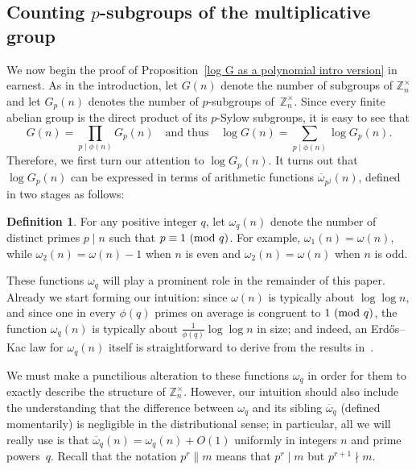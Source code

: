 \documentclass[12pt,reqno]{amsart}
\theoremstyle{definition}
\newtheorem{definition}[theorem]{Definition}
\renewcommand{\mod}[1]{{\ifmmode\text{\rm\ (mod~$#1$)}\else\discretionary{}{}{\hbox{ }}\rm(mod~$#1$)\fi}}
\newcommand{\ovomega}{{\overline\omega}}
\newcommand{\Z}{{\mathbb Z}}
\newcommand{\Znt}{{\Z_n^\times}}
\begin{document}
\subsection{Counting $p$-subgroups of the multiplicative group}

We now begin the proof of Proposition~\ref{log G as a polynomial intro version} in earnest. As in the introduction,
let $G(n)$ denote the number of subgroups of $\Znt$ and let $G_p(n)$ denotes the number of $p$-subgroups of~$\Znt$. Since every finite abelian group is the direct product of its $p$-Sylow subgroups, it is easy to see that
\[
G(n) = \prod_{p \mid \phi(n)} G_p(n) \quad\text{and thus}\quad \log G(n) = \sum_{p \mid \phi(n)} \log G_p(n).
\]
Therefore, we first turn our attention to $\log G_p(n)$. It turns out that $\log G_p(n)$ can be expressed in terms of arithmetic functions $\ovomega_{p^j}(n)$, defined in two stages as follows:

\begin{definition} \label{omega q def}
For any positive integer $q$, let $\omega_q(n)$ denote the number of distinct primes $p \mid n$ such that $p \equiv 1 \mod q$. For example, $\omega_1(n)=\omega(n)$, while $\omega_2(n) = \omega(n)-1$ when $n$ is even and $\omega_2(n) = \omega(n)$ when $n$ is odd.
\end{definition}

These functions $\omega_q$ will play a prominent role in the remainder of this paper.
Already we start forming our intuition: since $\omega(n)$ is typically about $\log\log n$, and since one in every $\phi(q)$ primes on average is congruent to $1\mod q$, the function $\omega_q(n)$ is typically about $\frac1{\phi(q)} \log\log n$ in size; and indeed, an Erd{\H o}s--Kac law for $\omega_q(n)$ itself is straightforward to derive from the results in~\cite{ek40}.

We must make a punctilious alteration to these functions $\omega_q$ in order for them to exactly describe the structure of $\Znt$. However, our intuition should also include the understanding that the difference between $\omega_q$ and its sibling $\ovomega_q$ (defined momentarily) is negligible in the distributional sense; in particular, all we will really use is that $\ovomega_q(n) = \omega_q(n) + O(1)$ uniformly in integers $n$ and prime powers~$q$. Recall that the notation $p^r \parallel m$ means that $p^r \mid m$ but $p^{r+1} \nmid m$.
\end{document}
